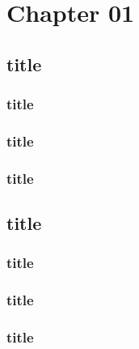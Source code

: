 \chapter{Chapter 01}
\lipsum[2]

\section{title}
\lipsum[1-3]
\subsection{title}
\lipsum[1-3]
\subsection{title}
\lipsum[1-3]
\subsection{title}
\lipsum[1-3]
\section{title}
\lipsum[1-3]
\subsection{title}
\lipsum[1-3]
\subsection{title}
\lipsum[1-3]
\subsection{title}
\lipsum[1-3]